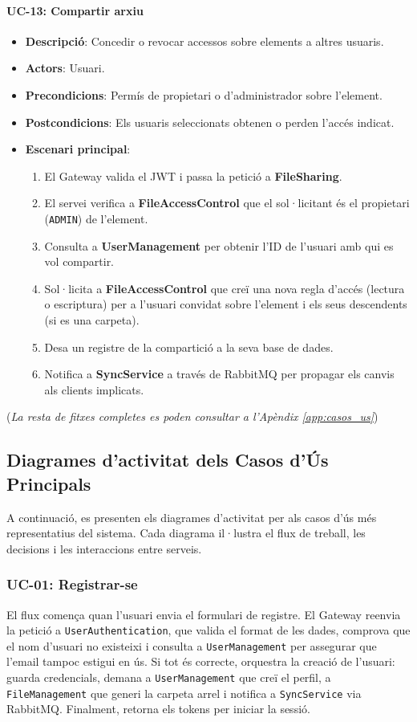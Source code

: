 \paragraph{UC-13: Compartir arxiu}
\begin{itemize}
  \item \textbf{Descripció}: Concedir o revocar accessos sobre elements a altres usuaris.
  \item \textbf{Actors}: Usuari.
  \item \textbf{Precondicions}: Permís de propietari o d'administrador sobre l'element.
  \item \textbf{Postcondicions}: Els usuaris seleccionats obtenen o perden l'accés indicat.
  \item \textbf{Escenari principal}:
    \begin{enumerate}
        \item El Gateway valida el JWT i passa la petició a \textbf{FileSharing}.
        \item El servei verifica a \textbf{FileAccessControl} que el sol·licitant és el propietari (\texttt{ADMIN}) de l'element.
        \item Consulta a \textbf{UserManagement} per obtenir l'ID de l'usuari amb qui es vol compartir.
        \item Sol·licita a \textbf{FileAccessControl} que creï una nova regla d'accés (lectura o escriptura) per a l'usuari convidat sobre l'element i els seus descendents (si es una carpeta).
        \item Desa un registre de la compartició a la seva base de dades.
        \item Notifica a \textbf{SyncService} a través de RabbitMQ per propagar els canvis als clients implicats.
    \end{enumerate}
\end{itemize}

(\emph{La resta de fitxes completes es poden consultar a l'Apèndix \ref{app:casos_us}})

\subsection{Diagrames d'activitat dels Casos d'Ús Principals}
A continuació, es presenten els diagrames d'activitat per als casos d'ús més representatius del sistema. Cada diagrama il·lustra el flux de treball, les decisions i les interaccions entre serveis.

\subsubsection{UC-01: Registrar-se}
El flux comença quan l'usuari envia el formulari de registre. El Gateway reenvia la petició a \texttt{UserAuthentication}, que valida el format de les dades, comprova que el nom d'usuari no existeixi i consulta a \texttt{UserManagement} per assegurar que l'email tampoc estigui en ús. Si tot és correcte, orquestra la creació de l'usuari: guarda credencials, demana a \texttt{UserManagement} que creï el perfil, a \texttt{FileManagement} que generi la carpeta arrel i notifica a \texttt{SyncService} via RabbitMQ. Finalment, retorna els tokens per iniciar la sessió.

